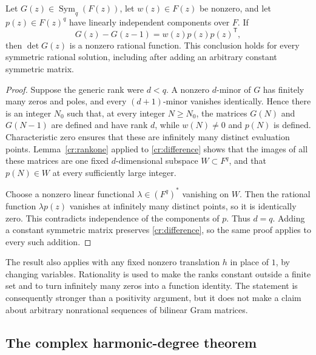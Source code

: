 \begin{theorem}
\label{cr:primitive}
Let $G(z)\in\operatorname{Sym}_q(F(z))$, let $w(z)\in F(z)$ be
nonzero, and let $p(z)\in F(z)^q$ have linearly independent
components over $F$.  If
\begin{equation}\label{cr:difference}
 G(z)-G(z-1)=w(z)p(z)p(z)^{\mathsf T},
\end{equation}
then $\det G(z)$ is a nonzero rational function.  This conclusion
holds for every symmetric rational solution, including after adding
an arbitrary constant symmetric matrix.
\end{theorem}
\begin{proof}
Suppose the generic rank were $d<q$.  A nonzero $d$-minor of $G$
has finitely many zeros and poles, and every $(d+1)$-minor vanishes
identically.  Hence there is an integer $N_0$ such that, at every
integer $N\ge N_0$, the matrices $G(N)$ and $G(N-1)$ are defined
and have rank $d$, while $w(N)\ne0$ and $p(N)$ is defined.
Characteristic zero ensures that these are infinitely many distinct
evaluation points.  Lemma~\ref{cr:rankone} applied to
\eqref{cr:difference} shows that the images of all these matrices
are one fixed $d$-dimensional subspace $W\subset F^q$, and that
$p(N)\in W$ at every sufficiently large integer.

Choose a nonzero linear functional $\lambda\in(F^q)^*$ vanishing
on $W$.  Then the rational function $\lambda p(z)$ vanishes at
infinitely many distinct points, so it is identically zero.  This
contradicts independence of the components of $p$.  Thus $d=q$.
Adding a constant symmetric matrix preserves \eqref{cr:difference},
so the same proof applies to every such addition.
\end{proof}

The result also applies with any fixed nonzero translation $h$ in
place of $1$, by changing variables.  Rationality is used to make
the ranks constant outside a finite set and to turn infinitely many
zeros into a function identity.  The statement is consequently stronger
than a positivity argument, but it does not make a claim about arbitrary
nonrational sequences of bilinear Gram matrices.

\subsection{The complex harmonic-degree theorem}


